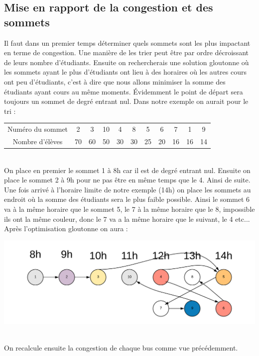\documentclass[a4paper,11pt]{article}
\begin{document}
	\subsection{Mise en rapport de la congestion et des sommets}
		Il faut dans un premier temps déterminer quels sommets sont les plus impactant en terme de congestion. Une manière de les trier peut être par ordre décroissant de leurs nombre d'étudiants. Ensuite on rechercherais une solution gloutonne où les sommets ayant le plus d'étudiants ont lieu à des horaires où les autres cours ont peu d'étudiants, c'est à dire que nous allons minimiser la somme des étudiants ayant cours au même moments. Évidemment le point de départ sera toujours un sommet de degré entrant nul. Dans notre exemple on aurait pour le tri : \\
		\begin{tabular}{ | c | c | c | c | c | c | c | c | c | c | c |}
 			\hline			
   			Numéro du sommet & 2 & 3 & 10 & 4 & 8 & 5 & 6 & 7 & 1 & 9\\
   			Nombre d'élèves & 70 & 60 & 50 & 30 & 30 & 25 & 20 & 16 & 16 & 14\\
 			\hline  
 		\end{tabular}\\	
 		On place en premier le sommet 1 à 8h car il est de degré entrant nul. Ensuite on place le sommet 2 à 9h pour ne pas être en même temps que le 4. Ainsi de suite. Une fois arrivé à l'horaire limite de notre exemple (14h) on place les sommets au endroit où la somme des étudiants sera le plus faible possible. Ainsi le sommet 6 va à la même horaire que le sommet 5, le 7 à la même horaire que le 8, impossible ils ont la même couleur, donc le 7 va a la même horaire que le suivant, le 4 etc...
 		Après l'optimisation gloutonne on aura : \\
 		\centerline{\includegraphics[scale=0.8]{Captures/exemple5.png}}\\
 		On recalcule ensuite la congestion de chaque bus comme vue précédemment.
\end{document}
